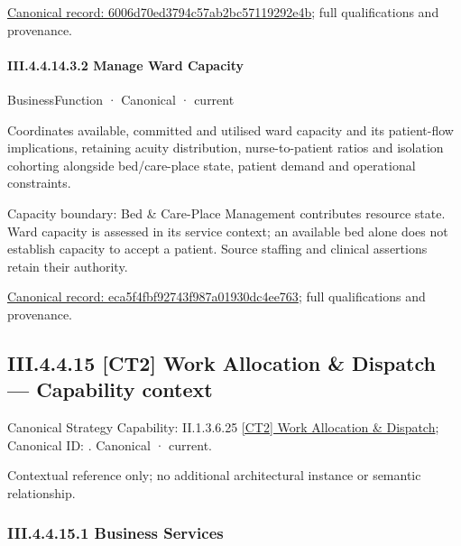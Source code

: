{\footnotesize \href{../../../../../../../continuum/business/business-function/6006d70ed3794c57ab2bc57119292e4b.md}{Canonical record: 6006d70ed3794c57ab2bc57119292e4b}; full qualifications and provenance.}\par
\paragraph*{III.4.4.14.3.2 Manage Ward Capacity}
\label{navigation:III.4.4.14.3.2}

\label{element:eca5f4fbf92743f987a01930dc4ee763}
{\small BusinessFunction · Canonical · current}\par

Coordinates available, committed and utilised ward capacity and its patient-flow implications, retaining acuity distribution, nurse-to-patient ratios and isolation cohorting alongside bed/care-place state, patient demand and operational constraints.



Capacity boundary: Bed \& Care-Place Management contributes resource state. Ward capacity is assessed in its service context; an available bed alone does not establish capacity to accept a patient. Source staffing and clinical assertions retain their authority.


{\footnotesize \href{../../../../../../../continuum/business/business-function/eca5f4fbf92743f987a01930dc4ee763.md}{Canonical record: eca5f4fbf92743f987a01930dc4ee763}; full qualifications and provenance.}\par
\subsection*{III.4.4.15 [CT2] Work Allocation \& Dispatch — Capability context}
\label{navigation:III.4.4.15}

{\small Canonical Strategy Capability: II.1.3.6.25 \hyperref[element:152a5252952c405994e9b171234efcb0]{[CT2] Work Allocation \& Dispatch}; Canonical ID: \texttt{}. Canonical · current.}\par
Contextual reference only; no additional architectural instance or semantic relationship.\par
\subsubsection*{III.4.4.15.1 Business Services}
\label{navigation:III.4.4.15.1}

